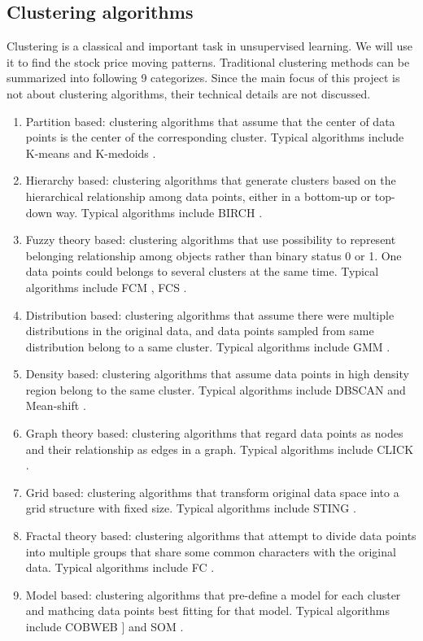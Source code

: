 \subsection{Clustering algorithms}
Clustering is a classical and important task in unsupervised learning. We will use it to find the stock price moving patterns. Traditional clustering methods can be summarized into following 9 categorizes. Since the main focus of this project is not about clustering algorithms, their technical details are not discussed.
\begin{enumerate}
    \item Partition based: clustering algorithms that assume that the center of data points is the center of the corresponding cluster. Typical algorithms include K-means \cite{macqueen1967some} and K-medoids \cite{park2009simple}.
    \item Hierarchy based: clustering algorithms that generate clusters based on the hierarchical relationship among data points, either in a bottom-up or top-down way. Typical algorithms include BIRCH \cite{zhang1996birch}.
    \item Fuzzy theory based: clustering algorithms that use possibility to represent belonging relationship among objects rather than binary status 0 or 1. One data points could belongs to several clusters at the same time. Typical algorithms include FCM \cite{bezdek1984fcm}, FCS \cite{dave1992adaptive}.
    \item Distribution based: clustering algorithms that assume there were multiple distributions in the original data, and data points sampled from same distribution belong to a same cluster. Typical algorithms include GMM \cite{rasmussen1999infinite}.
    \item Density based: clustering algorithms that assume data points in high density region belong to the same cluster. Typical algorithms include DBSCAN \cite{ester1996density} and Mean-shift \cite{comaniciu2002mean}.
    \item Graph theory based: clustering algorithms that regard data points as nodes and their relationship as edges in a graph. Typical algorithms include CLICK \cite{sharan2000click}.
    \item Grid based: clustering algorithms that transform original data space into a grid structure with fixed size. Typical algorithms include STING \cite{wang1997sting}.
    \item Fractal theory based: clustering algorithms that attempt to divide data points into multiple groups that share some common characters with the original data. Typical algorithms include FC \cite{barbara2000using}.
    \item Model based: clustering algorithms that pre-define a model for each cluster and mathcing data points best fitting for that model. Typical algorithms include COBWEB ]\cite{fisher1987knowledge} and SOM \cite{kohonen1990self}.
\end{enumerate}

